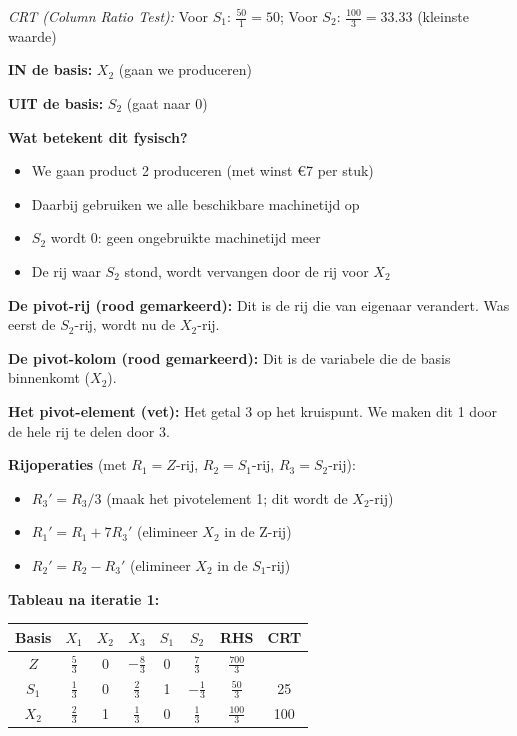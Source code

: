 \documentclass[a4paper,11pt]{article}
\begin{document}
\begin{oefenblok}
    \textit{CRT (Column Ratio Test):} Voor $S_1$: $\frac{50}{1} = 50$; Voor $S_2$: $\frac{100}{3} = 33.33$ (kleinste waarde)

    \begin{warningbox}
        \textbf{IN de basis:} $X_2$ (gaan we produceren)

        \textbf{UIT de basis:} $S_2$ (gaat naar 0)

        \textbf{Wat betekent dit fysisch?}
        \begin{itemize}
            \item We gaan product 2 produceren (met winst €7 per stuk)
            \item Daarbij gebruiken we alle beschikbare machinetijd op
            \item $S_2$ wordt 0: geen ongebruikte machinetijd meer
            \item De rij waar $S_2$ stond, wordt vervangen door de rij voor $X_2$
        \end{itemize}

        \textbf{De pivot-rij (rood gemarkeerd):} Dit is de rij die van eigenaar verandert. Was eerst de $S_2$-rij, wordt nu de $X_2$-rij.

        \textbf{De pivot-kolom (rood gemarkeerd):} Dit is de variabele die de basis binnenkomt ($X_2$).

        \textbf{Het pivot-element (vet):} Het getal 3 op het kruispunt. We maken dit 1 door de hele rij te delen door 3.
    \end{warningbox}

    \textbf{Rijoperaties} (met $R_1 = Z$-rij, $R_2 = S_1$-rij, $R_3 = S_2$-rij):
    \begin{itemize}
        \item $R_3' = R_3 / 3$ (maak het pivotelement 1; dit wordt de $X_2$-rij)
        \item $R_1' = R_1 + 7R_3'$ (elimineer $X_2$ in de Z-rij)
        \item $R_2' = R_2 - R_3'$ (elimineer $X_2$ in de $S_1$-rij)
    \end{itemize}

    \textbf{Tableau na iteratie 1:}

    \begin{center}
        \begin{tabular}{c|ccccc|c|c}
            \hline
            Basis & $X_1$         & $X_2$ & $X_3$          & $S_1$ & $S_2$          & RHS             & CRT \\
            \hline
            $Z$   & $\frac{5}{3}$ & 0     & $-\frac{8}{3}$ & 0     & $\frac{7}{3}$  & $\frac{700}{3}$ &     \\
            $S_1$ & $\frac{1}{3}$ & 0     & $\frac{2}{3}$  & 1     & $-\frac{1}{3}$ & $\frac{50}{3}$  & 25  \\
            $X_2$ & $\frac{2}{3}$ & 1     & $\frac{1}{3}$  & 0     & $\frac{1}{3}$  & $\frac{100}{3}$ & 100 \\
            \hline
        \end{tabular}
    \end{center}


\end{oefenblok}
\end{document}
